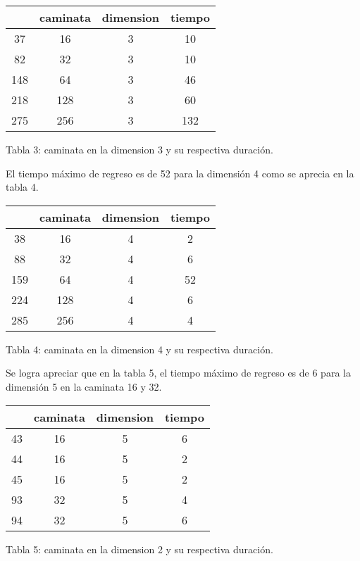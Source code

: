 \documentclass[12pt]{amsart}
\begin{document}
\bigskip
\begin{center}
 \begin{tabular}{||c c c c||} 
 \hline
     & caminata & dimension & tiempo \\ [0.5ex] 
 \hline\hline
 37 & 16 & 3 & 10 \\ 
 \hline
 82 & 32 & 3 & 10 \\
 \hline
 148 & 64 & 3 & 46 \\
 \hline
 218 & 128 & 3 & 60 \\
 \hline
 275 & 256 & 3 & 132 \\ [1ex] 
 \hline
\end{tabular}
\end{center}
\bigskip
\begin{center} \caption{Tabla 3: caminata en la dimension 3 y su respectiva duración.\label{tabla:3}}
\end{center}

\bigskip
\bigskip

El tiempo máximo de regreso es de 52 para la dimensión 4 como se aprecia en la tabla 4.

\bigskip
\begin{center}
 \begin{tabular}{||c c c c||} 
 \hline
     & caminata & dimension & tiempo \\ [0.5ex] 
 \hline\hline
 38 & 16 & 4 & 2 \\ 
 \hline
 88 & 32 & 4 & 6 \\
 \hline
 159 & 64 & 4 & 52 \\
 \hline
 224 & 128 & 4 & 6 \\
 \hline
 285 & 256 & 4 & 4 \\ [1ex] 
 \hline
\end{tabular}
\end{center}
\bigskip
\begin{center} \caption{Tabla 4: caminata en la dimension 4 y su respectiva duración.\label{tabla:4}}
\end{center}

\bigskip
Se logra apreciar que en la tabla 5, el tiempo máximo de regreso es de 6 para la dimensión 5 en la caminata 16 y 32.

\bigskip
\begin{center}
 \begin{tabular}{||c c c c||} 
 \hline
     & caminata & dimension & tiempo \\ [0.5ex] 
 \hline\hline
 43 & 16 & 5 & 6 \\ 
 \hline
 44 & 16 & 5 & 2 \\
 \hline
 45 & 16 & 5 & 2 \\
 \hline
 93 & 32 & 5 & 4 \\
 \hline
 94 & 32 & 5 & 6 \\ [1ex] 
 \hline
\end{tabular}
\end{center}
\bigskip
\begin{center} \caption{Tabla 5: caminata en la dimension 2 y su respectiva duración.\label{tabla:5}}
\end{center}
\end{document}
